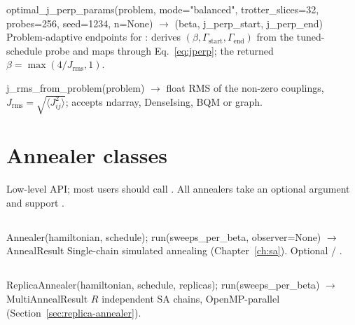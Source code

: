 \begin{apibox}{optimal\_j\_perp\_params(problem, mode="balanced",
trotter\_slices=32, probes=256, seed=1234, n=None)
$\rightarrow$ (beta, j\_perp\_start, j\_perp\_end)}
Problem-adaptive endpoints for : derives
$(\beta,\Gamma_{\text{start}},\Gamma_{\text{end}})$ from the tuned-schedule
probe and maps through Eq.~\eqref{eq:jperp}; the returned
$\beta=\max(4/J_{\mathrm{rms}},1)$.
\end{apibox}

\begin{apibox}{j\_rms\_from\_problem(problem) $\rightarrow$ float}
RMS of the non-zero couplings, $J_{\mathrm{rms}}=\sqrt{\langle
J_{ij}^2\rangle}$; accepts ndarray, DenseIsing, BQM or graph.
\end{apibox}

\section{Annealer classes}
\label{sec:api-annealers}

Low-level API; most users should call . All annealers take an
optional  argument and support .

\subsection{}

\begin{apibox}{Annealer(hamiltonian, schedule);\;\; run(sweeps\_per\_beta,
observer=None) $\rightarrow$ AnnealResult}
Single-chain simulated annealing (Chapter~\ref{ch:sa}). Optional
 / .
\end{apibox}

\subsection{}

\begin{apibox}{ReplicaAnnealer(hamiltonian, schedule, replicas);\;\;
run(sweeps\_per\_beta) $\rightarrow$ MultiAnnealResult}
$R$ independent SA chains, OpenMP-parallel
(Section~\ref{sec:replica-annealer}).
\end{apibox}

\subsection{}

